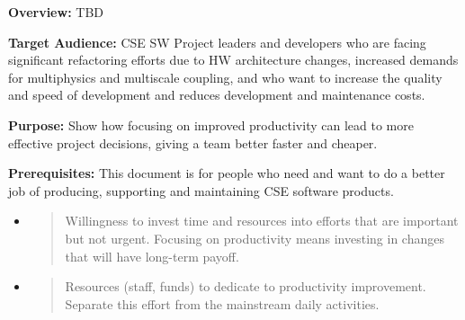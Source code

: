 \documentclass[]{article}
\date{}
\begin{document}
\pagestyle{fancy}
\renewcommand{\headrulewidth}{0pt}
  
\thispagestyle{empty}
\textbf{\newline}
\textbf{\newline}
\textbf{\newline}



\textbf{Overview:} TBD

\textbf{Target Audience:} CSE SW Project leaders and developers who are
facing significant refactoring efforts due to HW architecture changes,
increased demands for multiphysics and multiscale coupling, and who want
to increase the quality and speed of development and reduces development
and maintenance costs.

\textbf{Purpose:} Show how focusing on improved productivity can lead to
more effective project decisions, giving a team better faster and
cheaper.

\textbf{Prerequisites:} This document is for people who need and want to
do a better job of producing, supporting and maintaining CSE software
products.

\begin{itemize}
\item
  \begin{quote}
  Willingness to invest time and resources into efforts that are
  important but not urgent. Focusing on productivity means investing in
  changes that will have long-term payoff.
  \end{quote}
\item
  \begin{quote}
  Resources (staff, funds) to dedicate to productivity improvement.
  Separate this effort from the mainstream daily activities.
  \end{quote}
\end{itemize}
\end{document}
